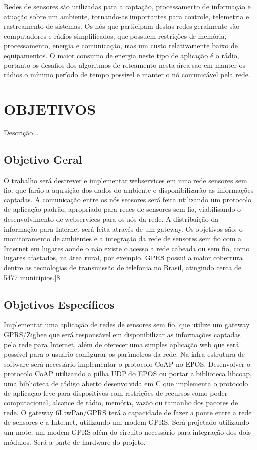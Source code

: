 Redes de sensores são utilizadas para a captação, processamento de informação e atuação sobre um ambiente, tornando-as importantes para controle, telemetria e rastreamento de sistemas. Os nós que participam destas redes geralmente são computadores e rádios simplificados, que possuem restrições de memória, processamento, energia e comunicação, mas um custo relativamente baixo de equipamentos. O maior consumo de energia neste tipo de aplicação é o rádio, portanto os desafios dos algoritmos de roteamento nesta área são em manter os rádios o mínimo período de tempo possível e manter o nó comunicável pela rede.

\section{OBJETIVOS}

Descrição...

\subsection{Objetivo Geral}

O trabalho será descrever e implementar webservices em uma rede sensores sem fio, que farão a aquisição dos dados do ambiente e disponibilizarão as informações captadas. A comunicação entre os nós sensores será feita utilizando um protocolo de aplicação padrão, apropriado para redes de sensores sem fio, viabilisando o desenvolvimento de webservices para os nós da rede.
A distribuição da informação para Internet será feita através de um gateway. Os objetivos são: o monitoramento de ambientes e a integração da rede de sensores sem fio com a Internet em lugares aonde o não existe o acesso a rede cabeada ou sem fio, como lugares afastados, na área rural, por exemplo. GPRS possui a maior cobertura dentre as tecnologias de transmissão de telefonia no Brasil, atingindo cerca de 5477 municípios.[8]


\subsection{Objetivos Específicos}

Implementar uma aplicação de redes de sensores sem fio, que utilize um gateway GPRS/Zigbee que será responsável em disponibilizar as informações captadas pela rede para Internet, além de oferecer uma simples aplicação web que será possível para o usuário configurar os parâmetros da rede.
Na infra-estrutura de software será necessário implementar o protocolo CoAP no EPOS. Desenvolver o protocolo CoAP utilizando a pilha UDP do EPOS ou portar a biblioteca libcoap, uma biblioteca de código aberto desenvolvida em C que implementa o protocolo de aplicaçao leve para dispositivos com restrições de recursos como poder computacional, alcance de rádio, memória, vazão ou tamanho dos pacotes de rede.
O gateway 6LowPan/GPRS terá a capacidade de fazer a ponte entre a rede de sensores e a Internet, utilizando um modem GPRS. Será projetado utilizando um mote, um modem GPRS além do circuito necessário para integração dos dois módulos. Será a parte de hardware do projeto.
